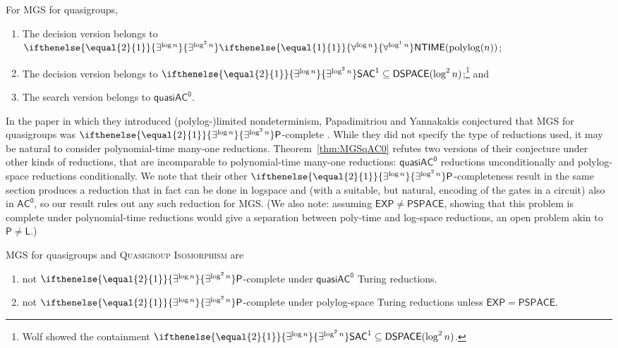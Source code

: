 \documentclass{theoretics}
\newcommand{\algprobm}[1]{\textsc{#1}\xspace}
\newcommand{\betacc}[1]{\ifthenelse{\equal{#1}{1}}{\exists^{\log n}}{\exists^{\log^{#1}n}}} %
\newcommand{\alphacc}[1]{\ifthenelse{\equal{#1}{1}}{\forall^{\log n}}{\forall^{\log^{#1}n}}} %
\newcommand*{\ComplexityClass}[1]{\ensuremath{\mathsf{#1}}\xspace}
\renewcommand{\P}{\ComplexityClass{P}}
\newcommand*{\EXP}{\ComplexityClass{EXP}}
\newcommand*{\LogSpace}{\ComplexityClass{L}}
\newcommand*{\PSPACE}{\ComplexityClass{PSPACE}}
\newcommand{\SAC}{\ComplexityClass{SAC}}
\newcommand{\ACz}{\ComplexityClass{AC^0}}
\newcommand{\qACz}{\ComplexityClass{quasiAC^0}}
\newcommand{\NTIME}{\ComplexityClass{NTIME}}
\begin{document}
\begin{theorem} \label{thm:MGSqAC0}
For \algprobm{MGS} for quasigroups, 
\renewcommand{\theenumi}{\alph{enumi}}
\begin{enumerate}
\item \label{thm:MGSqAC0:NTIME} The decision version belongs to $\betacc{2}\alphacc{1}\NTIME(\mathrm{polylog}(n))$;

\item \label{thm:MGSqAC0:SAC} The decision version belongs to $\betacc{2}\SAC^{1} \subseteq \mathsf{DSPACE}(\log^2 n)$;\footnote{Wolf \cite{Wolf} showed the containment $\betacc{2}\SAC^{1} \subseteq \mathsf{DSPACE}(\log^{2} n)$.} and

\item \label{thm:MGSqAC0:search} The search version belongs to $\qACz$.
\end{enumerate}
\end{theorem}
In the paper in which they introduced (polylog-)limited nondeterminism, Papadimitriou and Yannakakis conjectured that MGS for quasigroups was $\betacc{2}\P$-complete \cite[after Thm.~7]{PY}. While they did not specify the type of reductions used, it may be natural to consider polynomial-time many-one reductions. Theorem~\ref{thm:MGSqAC0} refutes two versions of their conjecture under other kinds of reductions, that are incomparable to polynomial-time many-one reductions: $\qACz$ reductions unconditionally and polylog-space reductions conditionally. We note that their other $\betacc{2}\P$-completeness result in the same section produces a reduction that in fact can be done in logspace and (with a suitable, but natural, encoding of the gates in a circuit) also in $\ACz$, so our result rules out any such reduction for \algprobm{MGS}. 
(We also note: assuming $\EXP \neq \PSPACE$, showing that this problem is complete under polynomial-time reductions would give a separation between poly-time and log-space reductions, an open problem akin to $\P \neq \LogSpace$.) 


\renewcommand{\theenumi}{\alph{enumi}}
\begin{corollary}
\algprobm{MGS} for quasigroups and \algprobm{Quasigroup Isomorphism} are 
\begin{enumerate}
\item not $\betacc{2} \P$-complete under $\qACz$ Turing reductions. 

\item not $\betacc{2} \P$-complete under polylog-space Turing reductions unless $\mathsf{EXP} = \mathsf{PSPACE}$.
\end{enumerate}
\end{corollary}
\end{document}
